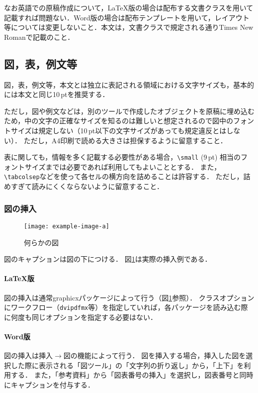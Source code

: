 \documentclass[
  platex, dvipdfmx,  %
]{nlp2025}
\newcommand{\pkg}[1]{\textsf{#1}}
\newcommand{\code}[1]{\texttt{#1}}
\begin{document}
なお英語での原稿作成について，LaTeX版の場合は配布する文書クラスを用いて記載すれば問題ない．Word版の場合は配布テンプレートを用いて，レイアウト等については変更しないこと．本文は，文書クラスで規定される通りTimes New Romanで記載のこと．



\subsection{図，表，例文等}
図，表，例文等，本文とは独立に表記される領域における文字サイズも，基本的には本文と同じ10\,ptを推奨する．

ただし，図や例文などは，別のツールで作成したオブジェクトを原稿に埋め込むため，中の文字の正確なサイズを知るのは難しいと想定されるので図中のフォントサイズは規定しない（10\,pt以下の文字サイズがあっても規定違反とはしない）．
ただし，A4印刷で読める大きさは担保するように留意すること．

表に関しても，情報を多く記載する必要性がある場合，\verb|\small| (9\,pt) 相当のフォントサイズまでは必要であれば利用してもよいこととする．
また，\verb|\tabcolsep|などを使って各セルの横方向を詰めることは許容する．
ただし，詰めすぎて読みにくくならないように留意すること．


\subsubsection{図の挿入}
%
\begin{figure}[t]
\centering
\texttt{[image: example-image-a]}
\caption{何らかの図}
\label{fig:sample}
\end{figure}

図のキャプションは図の下につける．
図\ref{fig:sample}は実際の挿入例である．


\paragraph{LaTeX版}
図の挿入は通常\pkg{graphicx}パッケージによって行う（図\ref{fig:sample}参照）．
クラスオプションにワークフロー（\code{dvipdfmx}等）を指定していれば，各パッケージを読み込む際に何度も同じオプションを指定する必要はない．


\paragraph{Word版}
図の挿入は挿入$\xrightarrow{}$図の機能によって行う．
図を挿入する場合，挿入した図を選択した際に表示される「図ツール」の「文字列の折り返し」から，「上下」を利用する．
また，「参考資料」から「図表番号の挿入」を選択し，図表番号と同時にキャプションを付与する．
\end{document}
